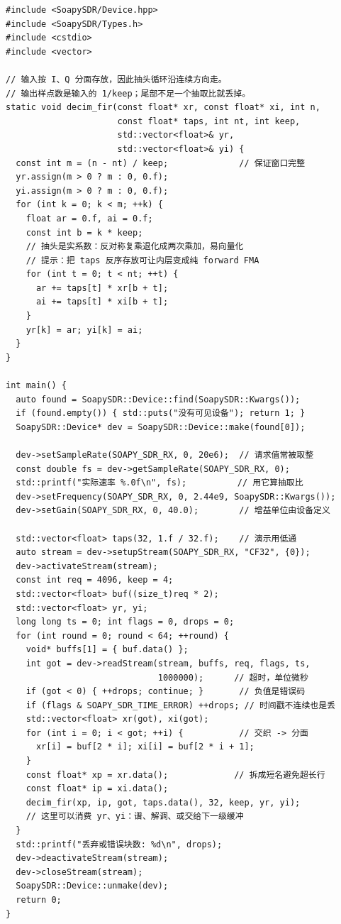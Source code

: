 \documentclass[12pt,a4paper,fontset=fandol]{ctexbook}
\begin{document}
\begin{lstlisting}[style=cppstyle,label={lst:ch15-soapy},caption={SoapySDR 收流：协商速率、解交织、整数倍抽取加 FIR}]
#include <SoapySDR/Device.hpp>
#include <SoapySDR/Types.h>
#include <cstdio>
#include <vector>

// 输入按 I、Q 分面存放，因此抽头循环沿连续方向走。
// 输出样点数是输入的 1/keep；尾部不足一个抽取比就丢掉。
static void decim_fir(const float* xr, const float* xi, int n,
                      const float* taps, int nt, int keep,
                      std::vector<float>& yr,
                      std::vector<float>& yi) {
  const int m = (n - nt) / keep;              // 保证窗口完整
  yr.assign(m > 0 ? m : 0, 0.f);
  yi.assign(m > 0 ? m : 0, 0.f);
  for (int k = 0; k < m; ++k) {
    float ar = 0.f, ai = 0.f;
    const int b = k * keep;
    // 抽头是实系数：反对称复乘退化成两次乘加，易向量化
    // 提示：把 taps 反序存放可让内层变成纯 forward FMA
    for (int t = 0; t < nt; ++t) {
      ar += taps[t] * xr[b + t];
      ai += taps[t] * xi[b + t];
    }
    yr[k] = ar; yi[k] = ai;
  }
}

int main() {
  auto found = SoapySDR::Device::find(SoapySDR::Kwargs());
  if (found.empty()) { std::puts("没有可见设备"); return 1; }
  SoapySDR::Device* dev = SoapySDR::Device::make(found[0]);

  dev->setSampleRate(SOAPY_SDR_RX, 0, 20e6);  // 请求值常被取整
  const double fs = dev->getSampleRate(SOAPY_SDR_RX, 0);
  std::printf("实际速率 %.0f\n", fs);          // 用它算抽取比
  dev->setFrequency(SOAPY_SDR_RX, 0, 2.44e9, SoapySDR::Kwargs());
  dev->setGain(SOAPY_SDR_RX, 0, 40.0);        // 增益单位由设备定义

  std::vector<float> taps(32, 1.f / 32.f);    // 演示用低通
  auto stream = dev->setupStream(SOAPY_SDR_RX, "CF32", {0});
  dev->activateStream(stream);
  const int req = 4096, keep = 4;
  std::vector<float> buf((size_t)req * 2);
  std::vector<float> yr, yi;
  long long ts = 0; int flags = 0, drops = 0;
  for (int round = 0; round < 64; ++round) {
    void* buffs[1] = { buf.data() };
    int got = dev->readStream(stream, buffs, req, flags, ts,
                              1000000);      // 超时，单位微秒
    if (got < 0) { ++drops; continue; }       // 负值是错误码
    if (flags & SOAPY_SDR_TIME_ERROR) ++drops; // 时间戳不连续也是丢
    std::vector<float> xr(got), xi(got);
    for (int i = 0; i < got; ++i) {           // 交织 -> 分面
      xr[i] = buf[2 * i]; xi[i] = buf[2 * i + 1];
    }
    const float* xp = xr.data();             // 拆成短名避免超长行
    const float* ip = xi.data();
    decim_fir(xp, ip, got, taps.data(), 32, keep, yr, yi);
    // 这里可以消费 yr、yi：谱、解调、或交给下一级缓冲
  }
  std::printf("丢弃或错误块数: %d\n", drops);
  dev->deactivateStream(stream);
  dev->closeStream(stream);
  SoapySDR::Device::unmake(dev);
  return 0;
}
\end{lstlisting}
\end{document}
